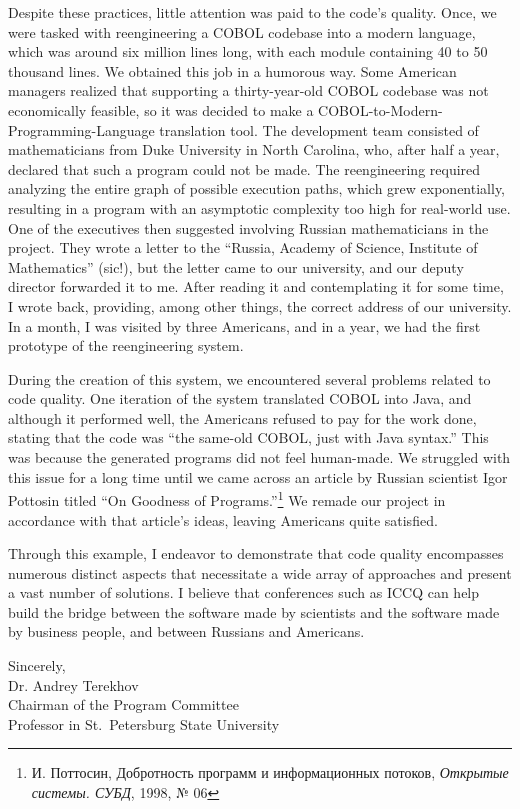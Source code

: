 Despite these practices, little attention was paid to the code's quality. Once, we were tasked with reengineering a COBOL codebase into a modern language, which was around six million lines long, with each module containing 40 to 50 thousand lines. We obtained this job in a humorous way. Some American managers realized that supporting a thirty-year-old COBOL codebase was not economically feasible, so it was decided to make a COBOL-to-Modern-Programming-Language translation tool. The development team consisted of mathematicians from Duke University in North Carolina, who, after half a year, declared that such a program could not be made. The reengineering required analyzing the entire graph of possible execution paths, which grew exponentially, resulting in a program with an asymptotic complexity too high for real-world use. One of the executives then suggested involving Russian mathematicians in the project. They wrote a letter to the ``Russia, Academy of Science, Institute of Mathematics'' (sic!), but the letter came to our university, and our deputy director forwarded it to me. After reading it and contemplating it for some time, I wrote back, providing, among other things, the correct address of our university. In a month, I was visited by three Americans, and in a year, we had the first prototype of the reengineering system.

During the creation of this system, we encountered several problems related to code quality. One iteration of the system translated COBOL into Java, and although it performed well, the Americans refused to pay for the work done, stating that the code was ``the same-old COBOL, just with Java syntax.'' This was because the generated programs did not feel human-made. We struggled with this issue for a long time until we came across an article by Russian scientist Igor Pottosin titled ``On Goodness of Programs.''\footnote{\raggedright{}\foreignlanguage{russian}{И. Поттосин, Добротность программ и информационных потоков, \textit{Открытые системы. СУБД}, 1998, № 06}} We remade our project in accordance with that article's ideas, leaving Americans quite satisfied.

Through this example, I endeavor to demonstrate that code quality encompasses numerous distinct aspects that necessitate a wide array of approaches and present a vast number of solutions. I believe that conferences such as ICCQ can help build the bridge between the software made by scientists and the software made by business people, and between Russians and Americans.

\vspace{18pt}
Sincerely,\\
Dr. Andrey Terekhov\\
Chairman of the Program Committee \\
Professor in St.~Petersburg State University
